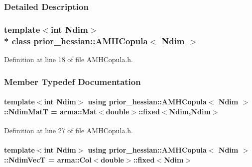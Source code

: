 \subsubsection{Detailed Description}
\subsubsection*{template$<$int Ndim$>$\\*
class prior\+\_\+hessian\+::\+A\+M\+H\+Copula$<$ Ndim $>$}



Definition at line 18 of file A\+M\+H\+Copula.\+h.



\subsubsection{Member Typedef Documentation}
\paragraph[{\texorpdfstring{Ndim\+MatT}{NdimMatT}}]{\setlength{\rightskip}{0pt plus 5cm}template$<$int Ndim$>$ using {\bf prior\+\_\+hessian\+::\+A\+M\+H\+Copula}$<$ Ndim $>$\+::{\bf Ndim\+MatT} =  arma\+::\+Mat$<$double$>$\+::fixed$<$Ndim,Ndim$>$}\hypertarget{classprior__hessian_1_1AMHCopula_a258252a11a49d2c73e19696b2e0e683d}{}\label{classprior__hessian_1_1AMHCopula_a258252a11a49d2c73e19696b2e0e683d}


Definition at line 27 of file A\+M\+H\+Copula.\+h.

\paragraph[{\texorpdfstring{Ndim\+VecT}{NdimVecT}}]{\setlength{\rightskip}{0pt plus 5cm}template$<$int Ndim$>$ using {\bf prior\+\_\+hessian\+::\+A\+M\+H\+Copula}$<$ Ndim $>$\+::{\bf Ndim\+VecT} =  arma\+::\+Col$<$double$>$\+::fixed$<$Ndim$>$}\hypertarget{classprior__hessian_1_1AMHCopula_aee8626a3e27e52d8bfecc5201808660a}{}\label{classprior__hessian_1_1AMHCopula_aee8626a3e27e52d8bfecc5201808660a}


